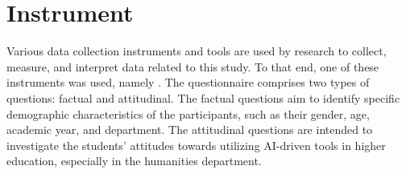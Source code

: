 \begin{Center}
	\begin{figure}
		\centering
	\end{figure}

	\begin{figure}
		\centering
	\end{figure}
\end{Center}
\begin{Center}
	\begin{figure}
		\centering
	\end{figure}

	\begin{figure}
		\centering
	\end{figure}
\end{Center}
\section{Instrument}
\justifying

Various data collection instruments and tools are used by research to collect,
measure, and interpret data related to this study. To that end, one of these
instruments was used, namely . The questionnaire comprises
two types of questions: factual and attitudinal. The factual questions aim to
identify specific demographic characteristics of the participants, such as
their gender, age, academic year, and department. The attitudinal questions
are intended to investigate the students’ attitudes towards utilizing AI-driven
tools in higher education, especially in the humanities department.


